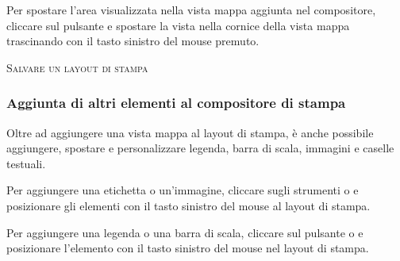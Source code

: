 Per spostare l'area visualizzata nella vista mappa aggiunta nel compositore,
cliccare sul pulsante  e spostare la vista nella cornice della vista mappa trascinando con
il tasto sinistro del mouse premuto.

\begin{Tip}\caption{\textsc{Salvare un layout di stampa}}
\end{Tip} 

\subsubsection{Aggiunta di altri elementi al compositore di stampa} 

Oltre ad aggiungere una vista mappa al layout di stampa, è anche possibile
aggiungere, spostare e personalizzare legenda, barra di scala, immagini e
caselle testuali.


Per aggiungere una etichetta o un'immagine, cliccare sugli strumenti
 o
 e posizionare gli
elementi con il tasto sinistro del mouse al layout di stampa.



Per aggiungere una legenda o una barra di scala, cliccare sul pulsante
 o
 e posizionare
l'elemento con il tasto sinistro del mouse nel layout di stampa.

